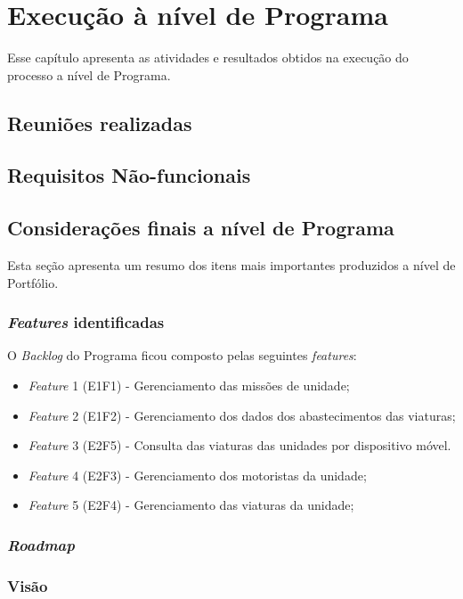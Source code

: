 \chapter{Execução à nível de Programa}

  Esse capítulo apresenta as atividades e resultados obtidos na execução do processo a nível de Programa.
  
  \section{Reuniões realizadas}
  
  \section{Requisitos Não-funcionais}
  
  \section{Considerações finais a nível de Programa}
    
    Esta seção apresenta um resumo dos itens mais importantes produzidos a nível de Portfólio.
    
    \subsection{\textit{Features} identificadas}
      
      O \textit{Backlog} do Programa ficou composto pelas seguintes \textit{features}:
      
      \begin{itemize}
       \item \textit{Feature} 1 (E1F1) - Gerenciamento das missões de unidade;
       \item \textit{Feature} 2 (E1F2) - Gerenciamento dos dados dos abastecimentos das viaturas;
       \item \textit{Feature} 3 (E2F5) - Consulta das viaturas das unidades por dispositivo móvel. 
       \item \textit{Feature} 4 (E2F3) - Gerenciamento dos motoristas da unidade;
       \item \textit{Feature} 5 (E2F4) - Gerenciamento das viaturas da unidade;
      \end{itemize}
      
    \subsection{\textit{Roadmap}}
    
    
    \subsection{Visão}